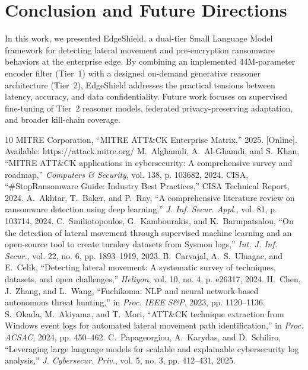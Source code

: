 \documentclass[10pt,journal,compsoc]{IEEEtran}
\begin{document}
\section{Conclusion and Future Directions}
In this work, we presented EdgeShield, a dual-tier Small Language Model framework for detecting lateral movement and pre-encryption ransomware behaviors at the enterprise edge. By combining an implemented 44M-parameter encoder filter (Tier~1) with a designed on-demand generative reasoner architecture (Tier~2), EdgeShield addresses the practical tensions between latency, accuracy, and data confidentiality. Future work focuses on supervised fine-tuning of Tier~2 reasoner models, federated privacy-preserving adaptation, and broader kill-chain coverage.


\begin{thebibliography}{10}
 MITRE Corporation, ``MITRE ATT\&CK Enterprise Matrix,'' 2025. [Online]. Available: https://attack.mitre.org/
 M.~Alghamdi, A.~Al-Ghamdi, and S.~Khan, ``MITRE ATT\&CK applications in cybersecurity: A comprehensive survey and roadmap,'' \emph{Computers \& Security}, vol. 138, p. 103682, 2024.
 CISA, ``\#StopRansomware Guide: Industry Best Practices,'' CISA Technical Report, 2024.
 A.~Akhtar, T.~Baker, and P.~Ray, ``A comprehensive literature review on ransomware detection using deep learning,'' \emph{J. Inf. Secur. Appl.}, vol. 81, p. 103714, 2024.
 C.~Smiliotopoulos, G.~Kambourakis, and K.~Barmpatsalou, ``On the detection of lateral movement through supervised machine learning and an open-source tool to create turnkey datasets from Sysmon logs,'' \emph{Int. J. Inf. Secur.}, vol. 22, no. 6, pp. 1893--1919, 2023.
 B.~Carvajal, A.~S.~Uluagac, and E.~Celik, ``Detecting lateral movement: A systematic survey of techniques, datasets, and open challenges,'' \emph{Heliyon}, vol. 10, no. 4, p. e26317, 2024.
 H.~Chen, J.~Zhang, and L.~Wang, ``Fuchikoma: NLP and neural network-based autonomous threat hunting,'' in \emph{Proc. IEEE S\&P}, 2023, pp. 1120--1136.
 S.~Okada, M.~Akiyama, and T.~Mori, ``ATT\&CK technique extraction from Windows event logs for automated lateral movement path identification,'' in \emph{Proc. ACSAC}, 2024, pp. 450--462.
 C.~Papageorgiou, A.~Karydas, and D.~Schiliro, ``Leveraging large language models for scalable and explainable cybersecurity log analysis,'' \emph{J. Cybersecur. Priv.}, vol. 5, no. 3, pp. 412--431, 2025.

\end{thebibliography}
\end{document}
